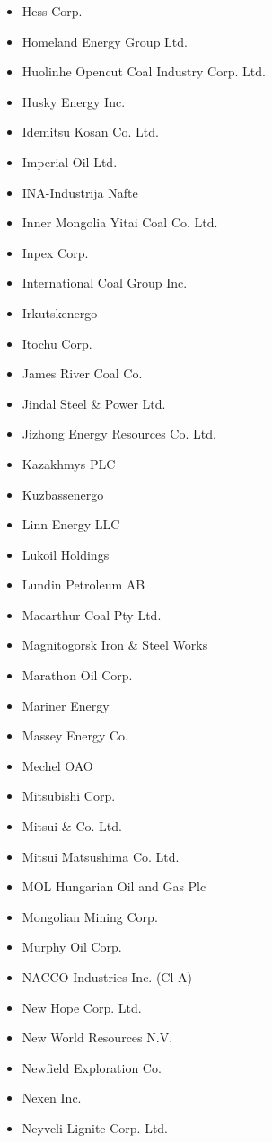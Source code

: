 \documentclass[10pt]{article}
\begin{document}
\begin{itemize}
  \item Hess Corp.
  \item Homeland Energy Group Ltd.
  \item Huolinhe Opencut Coal Industry Corp. Ltd.
  \item Husky Energy Inc.
  \item Idemitsu Kosan Co. Ltd.
  \item Imperial Oil Ltd.
  \item INA-Industrija Nafte
  \item Inner Mongolia Yitai Coal Co. Ltd.
  \item Inpex Corp.
  \item International Coal Group Inc.
  \item Irkutskenergo
  \item Itochu Corp.
  \item James River Coal Co.
  \item Jindal Steel \& Power Ltd.
  \item Jizhong Energy Resources Co. Ltd.
  \item Kazakhmys PLC
  \item Kuzbassenergo
  \item Linn Energy LLC
  \item Lukoil Holdings
  \item Lundin Petroleum AB
  \item Macarthur Coal Pty Ltd.
  \item Magnitogorsk Iron \& Steel Works
  \item Marathon Oil Corp.
  \item Mariner Energy
  \item Massey Energy Co.
  \item Mechel OAO
  \item Mitsubishi Corp.
  \item Mitsui \& Co. Ltd.
  \item Mitsui Matsushima Co. Ltd.
  \item MOL Hungarian Oil and Gas Plc
  \item Mongolian Mining Corp.
  \item Murphy Oil Corp.
  \item NACCO Industries Inc. (Cl A)
  \item New Hope Corp. Ltd.
  \item New World Resources N.V.
  \item Newfield Exploration Co.
  \item Nexen Inc.
  \item Neyveli Lignite Corp. Ltd.

\end{itemize}
\end{document}
